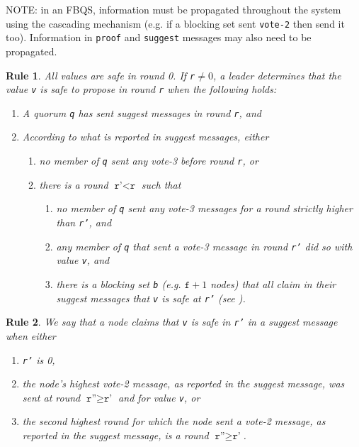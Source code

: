 \documentclass[11pt]{article}
\newtheorem{rrule}{Rule}
\begin{document}
NOTE: in an FBQS, information must be propagated throughout the
system using the cascading mechanism (e.g. if a blocking set sent
\texttt{vote-2} then send it too). Information in \texttt{proof} and
\texttt{suggest} messages may also need to be propagated.

\begin{rrule}
\label{rule:picking-safe-proposal}
All values are safe in round 0. If \texttt{r}$\neq 0$, a leader determines that the value \texttt{v} is safe to propose in round
  \texttt{r} when the following holds:
  \begin{enumerate}
    \item A quorum \texttt{q} has sent \textit{suggest} messages in round \texttt{r}, and
    \item According to what is reported in \textit{suggest} messages, either
      \begin{enumerate}
        \item no member of \texttt{q} sent any \textit{vote-3} before round
          \label{case:no_vote_leader}
          \texttt{r}, or
        \item there is a round $\texttt{r'}< \texttt{r}$ such that
          \label{case:highest_vote_leader}
          \begin{enumerate}
            \item no member of \texttt{q} sent any \textit{vote-3} messages for a
              round strictly higher than \texttt{r'}, and
            \item any member of \texttt{q} that sent a \textit{vote-3} message in
              round \texttt{r'} did so with value \texttt{v}, and
            \item there is a blocking set \texttt{b} (e.g. $ \texttt{f} +1$
              nodes) that all claim in their \textit{suggest} messages that
              \texttt{v} is safe at \texttt{r'} (see ).
          \end{enumerate}
      \end{enumerate}
  \end{enumerate}
\end{rrule}

\begin{rrule}
  \label{rule:claims_safe_leader}
We say that a node claims that \texttt{v} is safe in \texttt{r'} in a
suggest message when either
\begin{enumerate}
  \item \texttt{r'} is 0,
  \item the node's highest \textit{vote-2} message, as reported in the
    \textit{suggest} message, was sent at round $\texttt{r''}\geq \texttt{r'}$
    and for value \texttt{v}, or
  \item the second highest round for which the node sent a \textit{vote-2}
    message, as reported in the suggest message, is a round $\texttt{r''}\geq
    \texttt{r'}$.
\end{enumerate}
\end{rrule}
\end{document}
